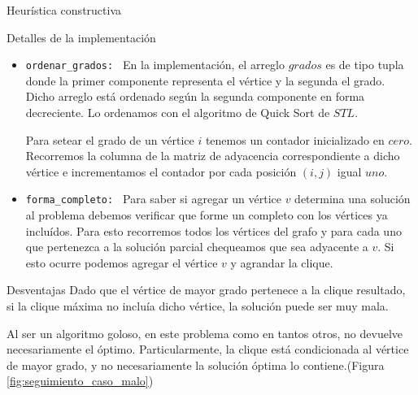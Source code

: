 \begin{section}{Heurística constructiva}
\begin{subsection}{Detalles de la implementación}
			\begin{itemize}
				\item \texttt{ordenar\_grados: } En la implementación, el arreglo $grados$ es de tipo tupla donde la primer componente representa el vértice y la segunda el grado. Dicho arreglo está ordenado según la segunda componente en forma decreciente. Lo ordenamos con el algoritmo de Quick Sort de $STL$.
				
				Para setear el grado de un vértice $i$ tenemos un contador inicializado en $cero$. Recorremos la columna de la matriz de adyacencia correspondiente a dicho vértice e incrementamos el contador por cada posición $(i,j)$ igual $uno$.
				\item \texttt{forma\_completo: } Para saber si agregar un vértice $v$ determina una solución al problema debemos verificar que forme un completo con los vértices ya incluídos. Para esto recorremos todos los vértices del grafo y para cada uno que pertenezca a la solución parcial chequeamos que sea adyacente a $v$. Si esto ocurre podemos agregar el vértice $v$ y agrandar la clique.
			\end{itemize}
		\end{subsection}
		\begin{subsection}{Desventajas }
			Dado que el vértice de mayor grado pertenece a la clique resultado, si la clique máxima no incluía dicho vértice, la solución puede ser muy mala.
			
			Al ser un algoritmo goloso, en este problema como en tantos otros, no devuelve necesariamente el óptimo. Particularmente, la clique está condicionada al vértice de mayor grado, y no necesariamente la solución óptima lo contiene.(Figura \ref{fig:seguimiento_caso_malo})


\end{subsection}
\end{section}
